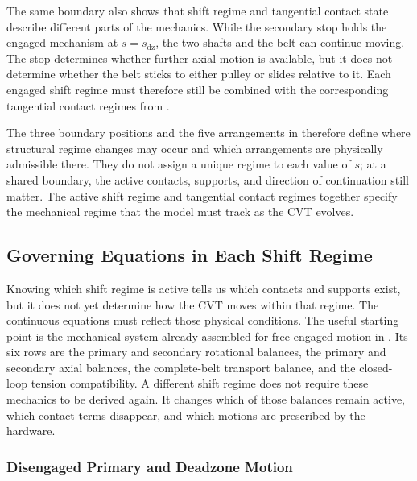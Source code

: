 \documentclass[11pt]{report}
\numberwithin{equation}{section}
\begin{document}
The same boundary also shows that shift regime and tangential contact
state describe different parts of the mechanics. While the secondary stop
holds the engaged mechanism at \(s=s_{\mathrm{dz}}\), the two shafts and the
belt can continue moving. The stop determines whether further axial motion is
available, but it does not determine whether the belt sticks to either pulley
or slides relative to it. Each engaged shift regime must therefore still
be combined with the corresponding tangential contact regimes from
.

The three boundary positions and the five arrangements in
 therefore define where structural
regime changes may occur and which arrangements are physically admissible
there. They do not assign a unique regime to each value of \(s\); at a shared
boundary, the active contacts, supports, and direction of continuation still
matter. The active shift regime and tangential contact regimes together specify
the mechanical regime that the model must track as the CVT evolves.


\subsection{Governing Equations in Each Shift Regime}
\label{sec:structural_regime_governing_equations}

Knowing which shift regime is active tells us which contacts and supports exist,
but it does not yet determine how the CVT moves within that regime. The
continuous equations must reflect those physical conditions. The useful
starting point is the mechanical system already assembled for free engaged
motion in . Its six rows are the
primary and secondary rotational balances, the primary and secondary axial
balances, the complete-belt transport balance, and the closed-loop tension
compatibility. A different shift regime does not require these mechanics to be
derived again. It changes which of those balances remain active, which contact
terms disappear, and which motions are prescribed by the hardware.

\subsubsection{Disengaged Primary and Deadzone Motion}
\label{sec:deadzone_continuous_regimes}
\end{document}
